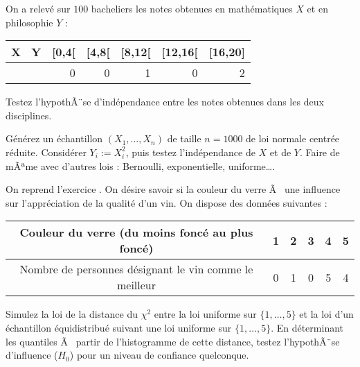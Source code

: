 \begin{exo}
  On a relevé sur $100$ bacheliers les notes obtenues en mathématiques $X$ et
  en philosophie $Y$ :
 \begin{center}
 \begin{tabular}{|l||r|r|r|r|r|} \hline
  X \ Y & [0,4[ & [4,8[ & [8,12[ & [12,16[ & [16,20] \\ \hline\hline
  [0,4[&3&4&2&0&0\\ \hline
  [4,8[&6&10&8&2&0\\ \hline
  [8,12[&1&8&20&12&3\\ \hline
  [12,16[&0&0&8&7&3\\ \hline
  [16,20]&0&0&1&0&2\\ \hline
 \end{tabular} 
 \end{center}
 Testez l'hypothÃ¨se d'indépendance entre les notes obtenues dans les deux
 disciplines.
\end{exo}

\begin{exo}
  Générez un échantillon $(X_1,\ldots,X_n)$ de taille $n=1000$ de loi normale
  centrée réduite. Considérer $Y_i:=X_i^2$, puis testez l'indépendance de $X$
  et de $Y$. Faire de mÃªme avec d'autres lois : Bernoulli, exponentielle,
  uniforme\ldots.
\end{exo}

\begin{exo}
  On reprend l'exercice \cite[page 97]{tomassone}. On désire
  savoir si la couleur du verre Ã  une influence sur l'appréciation de la
  qualité d'un vin. On dispose des données suivantes :
 \begin{center}
 \begin{tabular}{|c|c|c|c|c|c|}
  \hline Couleur du verre (du moins foncé au plus foncé)&1&2&3&4&5  \\
  \hline Nombre de personnes désignant le vin comme le meilleur & 0&1&0&5&4 \\
  \hline
 \end{tabular}
 \end{center}
 Simulez la loi de la distance du $\chi^2$ entre la loi uniforme sur
 $\{1,\ldots,5\}$ et la loi d'un échantillon équidistribué suivant une loi
 uniforme sur $\{1,\ldots,5\}$. En déterminant les quantiles Ã  partir de
 l'histogramme de cette distance, testez l'hypothÃ¨se d'influence ($H_0$) pour
 un niveau de confiance quelconque.
\end{exo}

